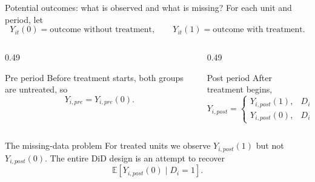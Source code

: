 \documentclass[10pt]{beamer}
\newcommand{\E}{\mathbb{E}}
\begin{document}
\begin{frame}{Potential outcomes: what is observed and what is missing?}
\label{slide:did_po_setup}
\small
For each unit and period, let
\[
Y_{it}(0)=\text{outcome without treatment},
\qquad
Y_{it}(1)=\text{outcome with treatment}.
\]

\begin{columns}[T]
\begin{column}{0.49\textwidth}
\begin{block}{Pre period}
Before treatment starts, both groups are untreated, so
\[
Y_{i,pre}=Y_{i,pre}(0).
\]
\end{block}
\end{column}
\begin{column}{0.49\textwidth}
\begin{block}{Post period}
After treatment begins,
\[
Y_{i,post}=
\begin{cases}
Y_{i,post}(1), & D_i=1,\\[0.3em]
Y_{i,post}(0), & D_i=0.
\end{cases}
\]
\end{block}
\end{column}
\end{columns}

\begin{alertblock}{The missing-data problem}
For treated units we observe $Y_{i,post}(1)$ but not $Y_{i,post}(0)$. The entire DiD design is an attempt to recover
\[
\E[Y_{i,post}(0)\mid D_i=1].
\]
\end{alertblock}
\end{frame}
\end{document}

